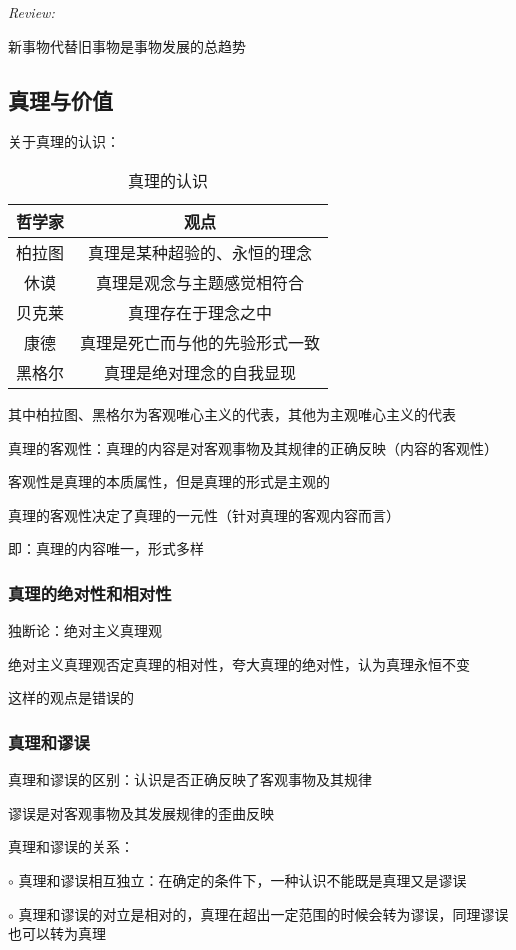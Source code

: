 \textit{Review:}

新事物代替旧事物是事物发展的总趋势
\subsection{真理与价值}%
\label{sub:真理与价值}
关于真理的认识：
\begin{table}[htpb]
    \centering
    \caption{真理的认识}
    \label{tab:真理的认识}
    \begin{tabular}{cc}
    \toprule
    哲学家 & 观点\\
    \midrule
    柏拉图 & 真理是某种超验的、永恒的理念\\
    休谟 & 真理是观念与主题感觉相符合\\
    贝克莱 & 真理存在于理念之中\\
    康德 & 真理是死亡而与他的先验形式一致\\
    黑格尔 & 真理是绝对理念的自我显现\\
    \bottomrule
    \end{tabular}
\end{table}
其中柏拉图、黑格尔为客观唯心主义的代表，其他为主观唯心主义的代表
\begin{notation}
    真理的客观性：真理的内容是对客观事物及其规律的正确反映（内容的客观性）

    客观性是真理的本质属性，但是真理的形式是主观的
\end{notation}
\begin{notation}
    真理的客观性决定了真理的一元性（针对真理的客观内容而言）

    即：真理的内容唯一，形式多样
\end{notation}
\subsubsection*{真理的绝对性和相对性}%
\label{subsub:真理的绝对性和相对性}
\begin{notation}
    独断论：绝对主义真理观

    绝对主义真理观否定真理的相对性，夸大真理的绝对性，认为真理永恒不变

    这样的观点是错误的
\end{notation}
\subsubsection*{真理和谬误}%
\label{subsub:真理和谬误}
真理和谬误的区别：认识是否正确反映了客观事物及其规律

谬误是对客观事物及其发展规律的歪曲反映
\begin{notation}
    真理和谬误的关系：

    $\circ$ 真理和谬误相互独立：在确定的条件下，一种认识不能既是真理又是谬误

    $\circ$ 真理和谬误的对立是相对的，真理在超出一定范围的时候会转为谬误，同理谬误也可以转为真理
\end{notation}

